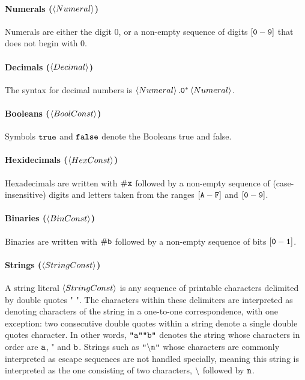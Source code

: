 \documentclass[english,a4paper,10pt]{article}
\begin{document}
\paragraph{Numerals ($\left\langle Numeral\right\rangle$)}
Numerals are
either the digit $0$,
or a non-empty sequence of digits $\left[{\tt 0}-{\tt 9}\right]$
that does not begin with $0$.

\paragraph{Decimals ($\left\langle Decimal\right\rangle$)}
The syntax for decimal numbers is $\left\langle Numeral\right\rangle{\tt .0^{*}}\left\langle Numeral\right\rangle$.

\paragraph{Booleans ($\left\langle BoolConst\right\rangle$)}
Symbols ${\tt true}$ and ${\tt false}$ denote the Booleans true and false.

\paragraph{Hexidecimals ($\left\langle HexConst\right\rangle$)}
Hexadecimals are written with ${\tt \#x}$
followed by a non-empty sequence of (case-insensitive) 
digits and letters taken from the ranges $\left[{\tt A}-{\tt F}\right]$
and $\left[{\tt 0}-{\tt 9}\right]$.

\paragraph{Binaries ($\left\langle BinConst\right\rangle$)}
Binaries are written with ${\tt \#b}$
followed by a non-empty sequence of bits $\left[{\tt 0}-{\tt 1}\right]$.

\paragraph{Strings ($\left\langle StringConst\right\rangle$)}
A string literal $\left\langle StringConst\right\rangle$
is any sequence of printable characters
delimited by double quotes $\texttt{"}$ $\texttt{"}$.
The characters within these delimiters
are interpreted as denoting characters of the string in a one-to-one correspondence,
with one exception:
two consecutive double quotes within a string
denote a single double quotes character.
In other words, $\texttt{"}{\tt a}\texttt{"}\texttt{"}{\tt b}\texttt{"}$ denotes the string
whose characters in order are ${\tt a}$, $\texttt{"}$ and ${\tt b}$.
Strings such as $\texttt{"}{\tt \backslash n}\texttt{"}$ whose characters are commonly
interpreted as escape sequences are not handled specially,
meaning this string is interpreted 
as the one consisting of two characters, ${\tt \backslash}$ followed by ${\tt n}$.
\end{document}
